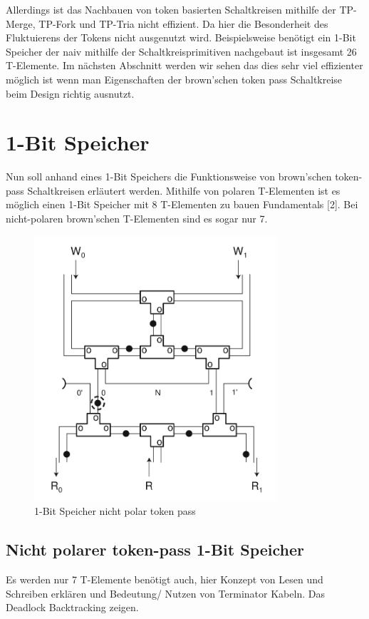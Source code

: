 \documentclass[11pt,a4paper]{article}
\begin{document}
%
Allerdings ist das Nachbauen von token basierten Schaltkreisen mithilfe
der TP-Merge, TP-Fork und TP-Tria nicht effizient.
%
Da hier die Besonderheit des Fluktuierens der Tokens nicht ausgenutzt wird.
%
Beispielsweise benötigt ein 1-Bit Speicher der naiv mithilfe der 
Schaltkreisprimitiven nachgebaut ist insgesamt 26 T-Elemente.
%
Im nächsten Abschnitt werden wir sehen das dies 
sehr viel effizienter möglich ist wenn man Eigenschaften der brown'schen 
token pass Schaltkreise beim Design richtig ausnutzt.

\section{1-Bit Speicher}
Nun soll anhand eines 1-Bit Speichers die Funktionsweise von brown'schen 
token-pass Schaltkreisen erläutert werden.
%
Mithilfe von polaren T-Elementen ist es möglich einen 1-Bit Speicher mit 8
T-Elementen zu bauen Fundamentals [2]. 
%
Bei nicht-polaren brown'schen T-Elementen sind es sogar nur 7.
%

\begin{figure}[h]
      \centering
      \includegraphics[width=9cm]{bilder/NonPolarMemory.png} 
      \caption{1-Bit Speicher nicht polar token pass}
\end{figure}

\subsection{Nicht polarer token-pass 1-Bit Speicher}
Es werden nur 7 T-Elemente benötigt auch, hier Konzept von Lesen und Schreiben
erklären und Bedeutung/ Nutzen von Terminator Kabeln.
Das Deadlock Backtracking zeigen.
\end{document}
